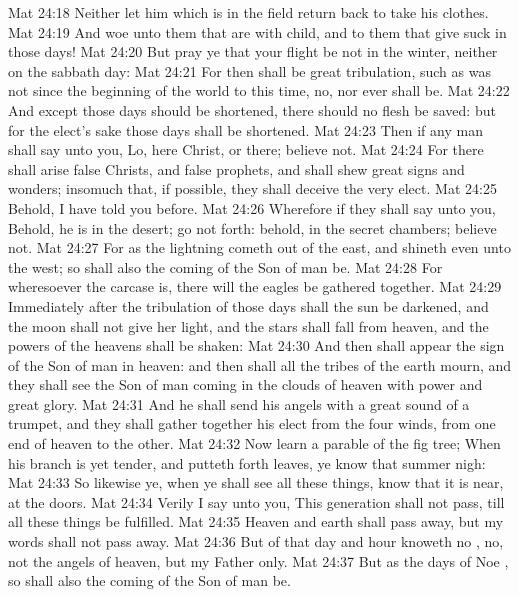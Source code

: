 \vs Mat 24:18 Neither let him which is in the field return back to take his clothes.
\vs Mat 24:19 And woe unto them that are with child, and to them that give suck in those days!
\vs Mat 24:20 But pray ye that your flight be not in the winter, neither on the sabbath day:
\vs Mat 24:21 For then shall be great tribulation, such as was not since the beginning of the world to this time, no, nor ever shall be.
\vs Mat 24:22 And except those days should be shortened, there should no flesh be saved: but for the elect's sake those days shall be shortened.
\vs Mat 24:23 Then if any man shall say unto you, Lo, here  Christ, or there; believe  not.
\vs Mat 24:24 For there shall arise false Christs, and false prophets, and shall shew great signs and wonders; insomuch that, if  possible, they shall deceive the very elect.
\vs Mat 24:25 Behold, I have told you before.
\vs Mat 24:26 Wherefore if they shall say unto you, Behold, he is in the desert; go not forth: behold,  in the secret chambers; believe  not.
\vs Mat 24:27 For as the lightning cometh out of the east, and shineth even unto the west; so shall also the coming of the Son of man be.
\vs Mat 24:28 For wheresoever the carcase is, there will the eagles be gathered together.
\vs Mat 24:29 Immediately after the tribulation of those days shall the sun be darkened, and the moon shall not give her light, and the stars shall fall from heaven, and the powers of the heavens shall be shaken:
\vs Mat 24:30 And then shall appear the sign of the Son of man in heaven: and then shall all the tribes of the earth mourn, and they shall see the Son of man coming in the clouds of heaven with power and great glory.
\vs Mat 24:31 And he shall send his angels with a great sound of a trumpet, and they shall gather together his elect from the four winds, from one end of heaven to the other.
\vs Mat 24:32 Now learn a parable of the fig tree; When his branch is yet tender, and putteth forth leaves, ye know that summer  nigh:
\vs Mat 24:33 So likewise ye, when ye shall see all these things, know that it is near,  at the doors.
\vs Mat 24:34 Verily I say unto you, This generation shall not pass, till all these things be fulfilled.
\vs Mat 24:35 Heaven and earth shall pass away, but my words shall not pass away.
\vs Mat 24:36 But of that day and hour knoweth no , no, not the angels of heaven, but my Father only.
\vs Mat 24:37 But as the days of Noe , so shall also the coming of the Son of man be.
